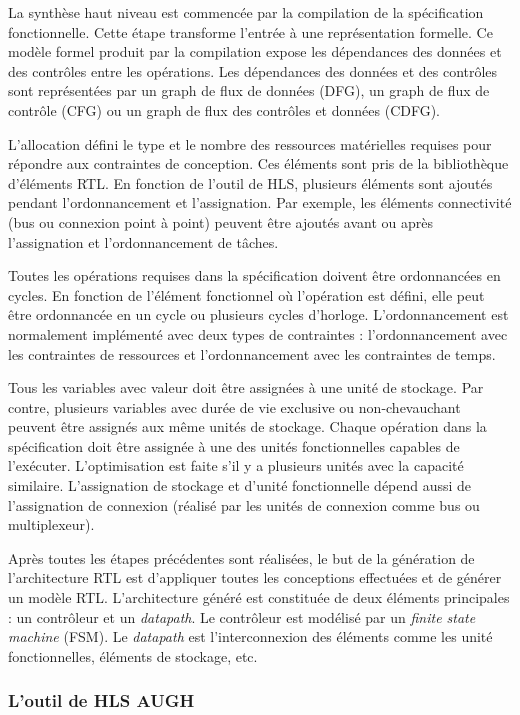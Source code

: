 La synthèse haut niveau est commencée par la compilation de la spécification fonctionnelle.
Cette étape transforme l'entrée à une représentation formelle. Ce modèle formel produit par la compilation
expose les dépendances des données et des contrôles entre les opérations. Les dépendances des données et des contrôles sont représentées
par un graph de flux de données (DFG), un graph de flux de contrôle (CFG) ou un graph de flux des contrôles et données (CDFG).

L'allocation défini le type et le nombre des ressources matérielles requises pour répondre aux contraintes de conception.
Ces éléments sont pris de la bibliothèque d'éléments RTL.
En fonction de l'outil de HLS, plusieurs éléments sont ajoutés pendant l'ordonnancement et l'assignation.
Par exemple, les éléments connectivité (bus ou connexion point à point) peuvent être ajoutés avant ou
après l'assignation et l'ordonnancement de tâches.

Toutes les opérations requises dans la spécification doivent être ordonnancées en cycles.
En fonction de l'élément fonctionnel où l'opération est défini, elle peut être ordonnancée
en un cycle ou plusieurs cycles d'horloge. L'ordonnancement est normalement implémenté avec deux types de contraintes :
l'ordonnancement avec les contraintes de ressources et l'ordonnancement avec les contraintes de temps.

Tous les variables avec valeur doit être assignées à une unité de stockage. Par contre, plusieurs variables
avec durée de vie exclusive ou non-chevauchant peuvent être assignés aux même unités de stockage.
Chaque opération dans la spécification doit être assignée à une des unités fonctionnelles capables de l'exécuter.
L'optimisation est faite s'il y a plusieurs unités avec la capacité similaire.
L'assignation de stockage et d'unité fonctionnelle dépend aussi de l'assignation de connexion (réalisé
par les unités de connexion comme bus ou multiplexeur).

Après toutes les étapes précédentes sont réalisées, le but de la génération de l'architecture RTL est d'appliquer toutes les conceptions
effectuées et de générer un modèle RTL. L'architecture généré est constituée de deux éléments principales : un contrôleur
et un \emph{datapath}. Le contrôleur est modélisé par un \emph{finite state machine} (FSM). Le \emph{datapath} est
l'interconnexion des éléments comme les unité fonctionnelles, éléments de stockage, etc.

\subsubsection*{L'outil de HLS AUGH}

